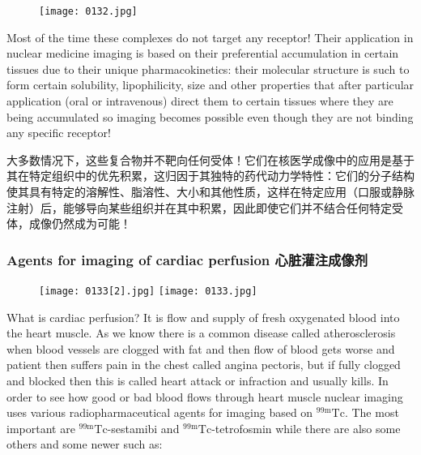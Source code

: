 \documentclass[dvipsnames, svgnames,a4paper,11pt]{article}
\begin{document}
\begin{figure}[h]
	\centering
    \texttt{[image: 0132.jpg]}    
     \label{fig133}
\end{figure}

Most of the time these complexes do not target any receptor! Their application in
nuclear medicine imaging is based on their preferential accumulation in certain
tissues due to their unique pharmacokinetics: their molecular structure is such to
form certain solubility, lipophilicity, size and other properties that after particular
application (oral or intravenous) direct them to certain tissues where they are being
accumulated so imaging becomes possible even though they are not binding any
specific receptor!

大多数情况下，这些复合物并不靶向任何受体！它们在核医学成像中的应用是基于其在特定组织中的优先积累，这归因于其独特的药代动力学特性：它们的分子结构使其具有特定的溶解性、脂溶性、大小和其他性质，这样在特定应用（口服或静脉注射）后，能够导向某些组织并在其中积累，因此即使它们并不结合任何特定受体，成像仍然成为可能！

\subsubsection{Agents for imaging of cardiac perfusion 心脏灌注成像剂}

\begin{figure}[h]
	\centering
    \texttt{[image: 0133[2].jpg]}    
    \hspace{0.1in}
    \texttt{[image: 0133.jpg]} 
     \label{fig134}
\end{figure}

What is cardiac perfusion? It is flow and supply of fresh oxygenated blood into the
heart muscle. As we know there is a common disease called atherosclerosis when
blood vessels are clogged with fat and then flow of blood gets worse and patient
then suffers pain in the chest called angina pectoris, but if fully clogged and blocked
then this is called heart attack or infraction and usually kills. In order to see how good
or bad blood flows through heart muscle nuclear imaging uses various
radiopharmaceutical agents for imaging based on ${}^\mathrm{99m}\mathrm{Tc}$. The most important are
${}^\mathrm{99m}\mathrm{Tc}$-sestamibi and ${}^\mathrm{99m}\mathrm{Tc}$-tetrofosmin while there are also some others and some
newer such as:
\end{document}
